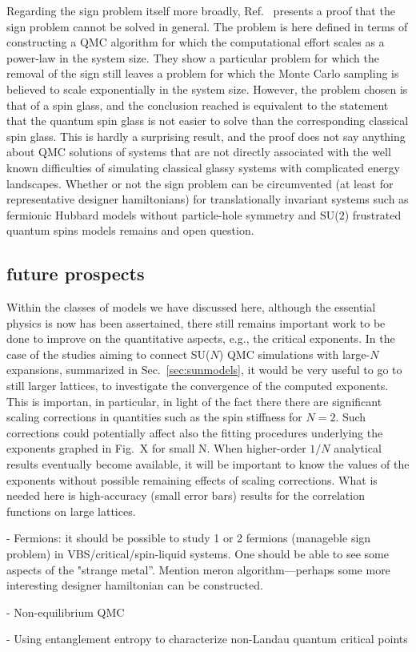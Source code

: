 \documentclass[range]{ar2e}
\begin{document}
Regarding the sign problem itself more broadly, Ref.~\cite{Troyer05} presents a proof that the sign problem cannot be solved in general. 
The problem is here defined in terms of constructing a QMC algorithm for which the computational effort scales as a power-law in the system
size. They show a particular problem for which the removal of the sign still leaves a problem for which the Monte Carlo sampling is believed 
to scale exponentially in the system size. However, the problem chosen is that of a spin glass, and the conclusion reached is equivalent to
the statement that the quantum spin glass is not easier to solve than the corresponding classical spin glass. This is hardly a surprising result, 
and the proof does not say anything about QMC solutions of systems that are not directly associated with the well known difficulties of simulating 
classical glassy systems with complicated energy landscapes. Whether or not the sign problem can be circumvented (at least for representative 
designer hamiltonians) for translationally invariant systems such as fermionic Hubbard models without particle-hole symmetry and SU($2$) frustrated 
quantum spins models remains and open question.

\subsection{future prospects}

Within the classes of models we have discussed here, although the essential physics is now has been assertained, there still remains
important work to be done to improve on the quantitative aspects, e.g., the critical exponents. In the case of the studies aiming to connect
SU($N$) QMC simulations with large-$N$ expansions, summarized in Sec.~\ref{sec:sunmodels}, it would be very useful to go to still larger lattices, 
to investigate the convergence of the computed exponents. This is importan, in particular, in light of the fact there there are significant scaling 
corrections in quantities such as the spin stiffness for $N=2$. Such corrections could potentially affect also the fitting procedures underlying 
the exponents graphed in Fig.~X for small N. When higher-order $1/N$ analytical results eventually become available, it will be important to know 
the values of the exponents without possible remaining effects of scaling corrections. What is needed here is high-accuracy (small error bars) 
results for the correlation functions on large lattices.

- Fermions: it should be possible to study 1 or 2 fermions (manageble sign problem) in 
VBS/critical/spin-liquid systems. One should be able to see some aspects of the "strange metal''.
Mention meron algorithm---perhaps some more interesting designer hamiltonian can be constructed.

- Non-equilibrium QMC

- Using entanglement entropy to characterize non-Landau quantum critical points




\end{document}
